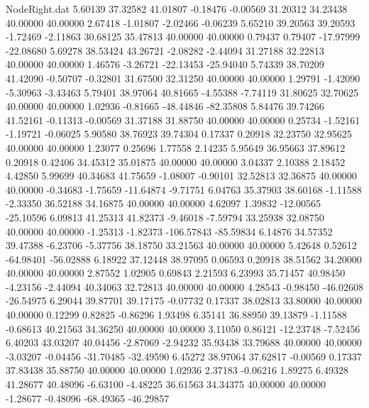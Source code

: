 \begin{filecontents}{NodeRight.dat}
   5.60139   37.32582   41.01807    -0.18476   -0.00569   31.20312   34.23438   40.00000   40.00000    2.67418   -1.01807   -2.02466   -0.06239
   5.65210   39.20563   39.20593    -1.72469   -2.11863   30.68125   35.47813   40.00000   40.00000    0.79437    0.79407  -17.97999  -22.08680
   5.69278   38.53424   43.26721    -2.08282   -2.44094   31.27188   32.22813   40.00000   40.00000    1.46576   -3.26721  -22.13453  -25.94040
   5.74339   38.70209   41.42090    -0.50707   -0.32801   31.67500   32.31250   40.00000   40.00000    1.29791   -1.42090   -5.30963   -3.43463
   5.79401   38.97064   40.81665    -4.55388   -7.74119   31.80625   32.70625   40.00000   40.00000    1.02936   -0.81665  -48.44846  -82.35808
   5.84476   39.74266   41.52161    -0.11313   -0.00569   31.37188   31.88750   40.00000   40.00000    0.25734   -1.52161   -1.19721   -0.06025
   5.90580   38.76923   39.74304     0.17337    0.20918   32.23750   32.95625   40.00000   40.00000    1.23077    0.25696    1.77558    2.14235
   5.95649   36.95663   37.89612     0.20918    0.42406   34.45312   35.01875   40.00000   40.00000    3.04337    2.10388    2.18452    4.42850
   5.99699   40.34683   41.75659    -1.08007   -0.90101   32.52813   32.36875   40.00000   40.00000   -0.34683   -1.75659  -11.64874   -9.71751
   6.04763   35.37903   38.60168    -1.11588   -2.33350   36.52188   34.16875   40.00000   40.00000    4.62097    1.39832  -12.00565  -25.10596
   6.09813   41.25313   41.82373    -9.46018   -7.59794   33.25938   32.08750   40.00000   40.00000   -1.25313   -1.82373 -106.57843  -85.59834
   6.14876   34.57352   39.47388    -6.23706   -5.37756   38.18750   33.21563   40.00000   40.00000    5.42648    0.52612  -64.98401  -56.02888
   6.18922   37.12448   38.97095     0.06593    0.20918   38.51562   34.20000   40.00000   40.00000    2.87552    1.02905    0.69843    2.21593
   6.23993   35.71457   40.98450    -4.23156   -2.44094   40.34063   32.72813   40.00000   40.00000    4.28543   -0.98450  -46.02608  -26.54975
   6.29044   39.87701   39.17175    -0.07732    0.17337   38.02813   33.80000   40.00000   40.00000    0.12299    0.82825   -0.86296    1.93498
   6.35141   36.88950   39.13879    -1.11588   -0.68613   40.21563   34.36250   40.00000   40.00000    3.11050    0.86121  -12.23748   -7.52456
   6.40203   43.03207   40.04456    -2.87069   -2.94232   35.93438   33.79688   40.00000   40.00000   -3.03207   -0.04456  -31.70485  -32.49590
   6.45272   38.97064   37.62817    -0.00569    0.17337   37.83438   35.88750   40.00000   40.00000    1.02936    2.37183   -0.06216    1.89275
   6.49328   41.28677   40.48096    -6.63100   -4.48225   36.61563   34.34375   40.00000   40.00000   -1.28677   -0.48096  -68.49365  -46.29857

\end{filecontents}
